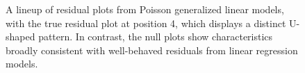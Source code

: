 \documentclass[
doublespace,
  times]{anzsauth}
\newenvironment{Shaded}{\begin{snugshade}}{\end{snugshade}}
\newcommand{\AttributeTok}[1]{\textcolor[rgb]{0.40,0.45,0.13}{#1}}
\newcommand{\DecValTok}[1]{\textcolor[rgb]{0.68,0.00,0.00}{#1}}
\newcommand{\FloatTok}[1]{\textcolor[rgb]{0.68,0.00,0.00}{#1}}
\newcommand{\FunctionTok}[1]{\textcolor[rgb]{0.28,0.35,0.67}{#1}}
\newcommand{\NormalTok}[1]{\textcolor[rgb]{0.00,0.23,0.31}{#1}}
\newcommand{\OtherTok}[1]{\textcolor[rgb]{0.00,0.23,0.31}{#1}}
\newcommand{\SpecialCharTok}[1]{\textcolor[rgb]{0.37,0.37,0.37}{#1}}
\newcommand{\StringTok}[1]{\textcolor[rgb]{0.13,0.47,0.30}{#1}}
\begin{document}
\begin{Shaded}
\end{Shaded}

\begin{figure}[H]


\caption{\label{fig-pois-lineup}A lineup of residual plots from Poisson
generalized linear models, with the true residual plot at position 4,
which displays a distinct U-shaped pattern. In contrast, the null plots
show characteristics broadly consistent with well-behaved residuals from
linear regression models.}

\end{figure}%
\end{document}
